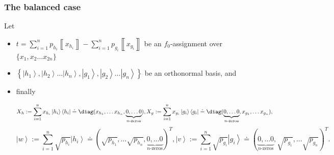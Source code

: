 \documentclass{theoretics}
\begin{document}
\subsubsection{The balanced case}
\label{subsub:balancedf0algebraic}
\begin{proposition}
  \label{prop:balancedf0algeb}
  Let
  \begin{itemize}
    \item $
            t=\sum_{i=1}^{n}p_{h_{i}}\left\llbracket x_{h_{i}}\right\rrbracket -\sum_{i=1}^{n}p_{g_{i}}\left\llbracket x_{g_{i}}\right\rrbracket
          $ be an $f_{0}$-assignment over $\{x_{1},x_{2}\dots x_{2n}\}$

    \item $\left\{ \left|h_{1}\right\rangle ,\left|h_{2}\right\rangle \dots\left|h_{n}\right\rangle ,\left|g_{1}\right\rangle ,\left|g_{2}\right\rangle \dots\left|g_{n}\right\rangle \right\} $
          be an orthonormal basis, and
    \item finally
          \begin{footnotesize}
            \begin{displaymath}
              X_{h}:=\sum_{i=1}^{n}x_{h_{i}}\left|h_{i}\right\rangle \left\langle h_{i}\right|\doteq\diag(x_{h_{1}},\dots x_{h_{n}},\underbrace{0,\dots0}_{n\text{-zeros}}),
              X_{g}:=\sum_{i=1}^{n}x_{g_{i}}\left|g_{i}\right\rangle \left\langle g_{i}\right|\doteq\diag(\underbrace{0,\dots0}_{n\text{-zeros}},x_{g_{1}},\dots x_{g_{n}}),
            \end{displaymath}
            \begin{displaymath}
              \left|w\right\rangle :=\sum_{i=1}^{n}\sqrt{p_{h_{i}}}\left|h_{i}\right\rangle \doteq(\sqrt{p_{h_{1}}},\dots\sqrt{p_{h_{n}}},\underbrace{0,\dots0}_{n\text{-zeros}})^{T},
              \left|v\right\rangle :=\sum_{i=1}^{n}\sqrt{p_{g_{i}}}\left|g_{i}\right\rangle \doteq(\underbrace{0,\dots0}_{n\text{-zeros}},\sqrt{p_{g_{1}}},\dots\sqrt{p_{g_{n}}})^{T}.
            \end{displaymath}
          \end{footnotesize}


\end{itemize}
\end{proposition}
\end{document}
